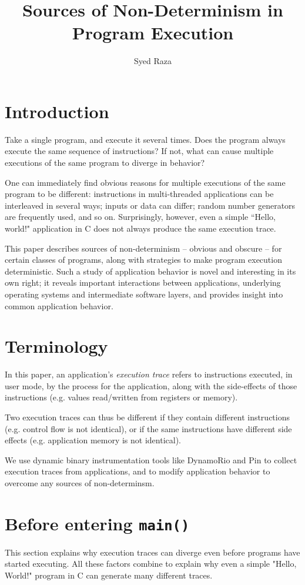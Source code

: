 \documentclass[11pt]{article} %
\title{Sources of Non-Determinism in Program Execution}
\author{Syed Raza}
\begin{document}
\maketitle

\section{Introduction}
Take a single program, and execute it several times. Does the program always execute
the same sequence of instructions? If not, what can cause multiple executions of the same program 
to diverge in behavior? 

One can immediately find obvious reasons for multiple executions of the same program to be different: instructions in multi-threaded 
applications can be interleaved in several ways; inputs or data can differ; random number
generators are frequently used, and so on.
Surprisingly, however, even a simple ``Hello, world!" application in C does not
always produce the same execution trace.

This paper describes sources of non-determinism  -- obvious and obscure --
for certain classes of programs, along with strategies to make program execution 
deterministic. Such a study of application behavior is novel and
interesting in its own right; it reveals important interactions between
applications, underlying operating systems and intermediate software layers,
and provides insight into common application behavior.

\section{Terminology}
In this paper, an application's \emph{execution trace} refers to instructions executed, in user mode,
by the process for the application, along with the side-effects of those instructions (e.g. values read/written from registers or memory).

Two execution traces can thus be different if they contain different instructions (e.g. control flow is not identical),
or if the same instructions have different side effects (e.g. application memory is not identical).

We use dynamic binary instrumentation tools like DynamoRio and Pin to collect execution traces from 
applications, and to modify application behavior to overcome any sources of non-determinsm.

\section{Before entering \texttt{main()}}
This section explains why execution traces can diverge even before programs
have started executing. All these factors combine to explain why 
even a simple "Hello, World!" program in C can generate many different
traces.
\end{document}
